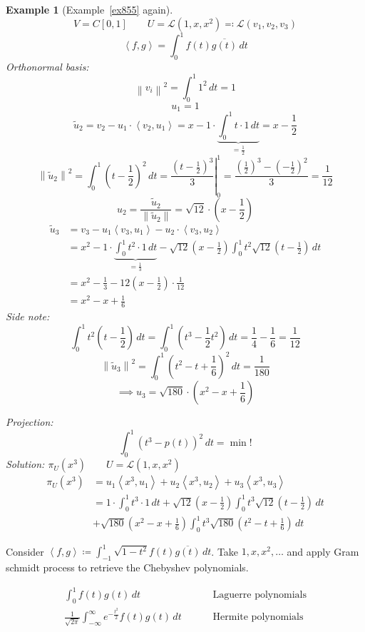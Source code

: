 \documentclass{article}
\newtheorem{example}{Example}  \numberwithin{example}{section}
\newcommand{\ip}[2]{\left\langle#1,#2\right\rangle} %
\newcommand{\norm}[1]{\left\|#1\right\|}
\begin{document}
\begin{example}[Example~\ref{ex855} again] %
  \[ V = C[0,1] \qquad U = \mathcal L(1, x, x^2) \eqqcolon \mathcal L(v_1, v_2, v_3) \]
  \[ \ip fg = \int_0^1 f(t) \overline{g(t)} \, dt \]
  Orthonormal basis:
  \[ \norm{v_i}^2 = \int_0^1 1^2 \, dt = 1 \]
  \[ u_1 = 1 \]
  \[ \tilde u_2 = v_2 - u_1 \cdot \ip{v_2}{u_1} = x - 1 \cdot \underbrace{\int_0^1 t \cdot 1 \, dt}_{= \frac12} = x - \frac12 \]
  \[ \norm{\tilde u_2}^2 = \int_0^1 (t - \frac12)^2 \, dt = \left.\frac{(t - \frac12)^3}{3} \right|_0^1 = \frac{(\frac12)^3 - (-\frac12)^2}{3} = \frac1{12} \]
  \[ u_2 = \frac{\tilde u_2}{\norm{\tilde u_2}} = \sqrt{12} \cdot (x - \frac12) \]
  \begin{align*}
    \tilde u_3 &= v_3 - u_1 \ip{v_3}{u_1} - u_2 \cdot \ip{v_3}{u_2} \\
      &= x^2 - 1 \cdot \underbrace{\int_0^1 t^2 \cdot 1 \, dt}_{= \frac13} - \sqrt{12} (x - \frac12) \int_0^1 t^2 \sqrt{12} (t - \frac12) \, dt \\
      &= x^2 - \frac13 - 12 (x - \frac12) \cdot \frac1{12} \\
      &= x^2 - x + \frac16
  \end{align*}
  Side note:
  \[ \int_0^1 t^2 (t - \frac12) \, dt = \int_0^1 (t^3 - \frac12 t^2) \, dt = \frac14 - \frac16 = \frac1{12} \]
  \[ \norm{\tilde u_3}^2 = \int_0^1 (t^2 - t + \frac16)^2 \, dt = \frac1{180} \]
  \[ \implies u_3 = \sqrt{180} \cdot (x^2 - x + \frac16) \]

  Projection:
  \[ \int_0^1 (t^3 - p(t))^2 \, dt = \operatorname{min}! \]
  Solution: $\pi_U(x^3) \qquad U = \mathcal L(1, x, x^2)$
  \begin{align*}
    \pi_U(x^3) &= u_1 \ip{x^3}{u_1} + u_2 \ip{x^3}{u_2} + u_3 \ip{x^3}{u_3} \\
      &= 1 \cdot \int_0^1  t^3 \cdot 1 \, dt + \sqrt{12} \left(x - \frac12\right) \int_0^1 t^3 \sqrt{12} \left(t - \frac12\right) \, dt \\
      &+ \sqrt{180} \left(x^2 - x + \frac16\right) \int_0^1 t^3 \sqrt{180} \left(t^2 - t + \frac16\right) \, dt
  \end{align*}
\end{example}

Consider $\ip fg \coloneqq \int_{-1}^1 \sqrt{1 - t^2} f(t) \overline{g(t)} \, dt$.
Take $1, x, x^2, \ldots$ and apply Gram schmidt process to retrieve the Chebyshev polynomials.

\begin{align*}
  \int_0^1 f(t) g(t) \, dt &\qquad \text{ Laguerre polynomials} \\
  \frac1{\sqrt{2\pi}} \int_{-\infty}^\infty e^{-\frac{t^2}{2}}  f(t) g(t) \, dt &\qquad \text{ Hermite polynomials}
\end{align*}
\end{document}
